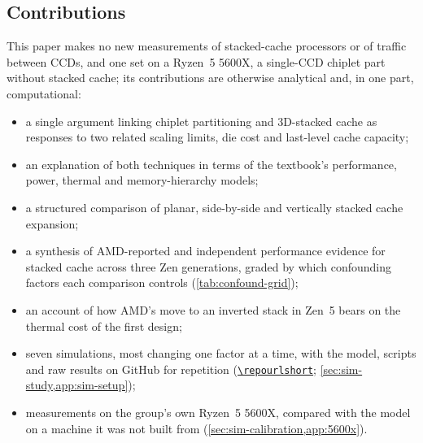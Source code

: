 \subsection{Contributions}
\label{sec:contributions}

This paper makes no new measurements of stacked-cache processors or of traffic between CCDs, and one set on a Ryzen~5 5600X, a single-CCD chiplet part without stacked cache; its contributions are otherwise analytical and, in one part, computational:
\begin{itemize}
  \item a single argument linking chiplet partitioning and 3D-stacked cache as responses to two related scaling limits, die cost and last-level cache capacity;
  \item an explanation of both techniques in terms of the textbook's performance, power, thermal and memory-hierarchy models;
  \item a structured comparison of planar, side-by-side and vertically stacked cache expansion;
  \item a synthesis of AMD-reported and independent performance evidence for stacked cache across three Zen generations, graded by which confounding factors each comparison controls (\cref{tab:confound-grid});
  \item an account of how AMD's move to an inverted stack in Zen~5 bears on the thermal cost of the first design;
  \item seven simulations, most changing one factor at a time, with the model, scripts and raw results on GitHub for repetition (\href{\repourl}{\nolinkurl{\repourlshort}}; \cref{sec:sim-study,app:sim-setup});
  \item measurements on the group's own Ryzen~5 5600X, compared with the model on a machine it was not built from (\cref{sec:sim-calibration,app:5600x}).
\end{itemize}


